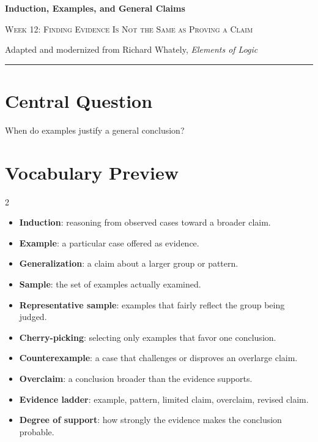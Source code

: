 \documentclass[12pt]{article}
\begin{document}
\begin{center}
{\LARGE\bfseries Induction, Examples, and General Claims}\par\vspace{0.25em}
{\large\scshape Week 12: Finding Evidence Is Not the Same as Proving a Claim}\par\vspace{0.5em}
{Adapted and modernized from Richard Whately, \textit{Elements of Logic}}\par\vspace{0.6em}
\rule{0.82\textwidth}{0.4pt}
\end{center}

\section*{Central Question}
When do examples justify a general conclusion?

\section*{Vocabulary Preview}
\begin{multicols}{2}
\begin{itemize}[leftmargin=*, itemsep=0.18em]
\item \textbf{Induction}: reasoning from observed cases toward a broader claim.
\item \textbf{Example}: a particular case offered as evidence.
\item \textbf{Generalization}: a claim about a larger group or pattern.
\item \textbf{Sample}: the set of examples actually examined.
\item \textbf{Representative sample}: examples that fairly reflect the group being judged.
\item \textbf{Cherry-picking}: selecting only examples that favor one conclusion.
\item \textbf{Counterexample}: a case that challenges or disproves an overlarge claim.
\item \textbf{Overclaim}: a conclusion broader than the evidence supports.
\item \textbf{Evidence ladder}: example, pattern, limited claim, overclaim, revised claim.
\item \textbf{Degree of support}: how strongly the evidence makes the conclusion probable.
\end{itemize}
\end{multicols}
\end{document}
